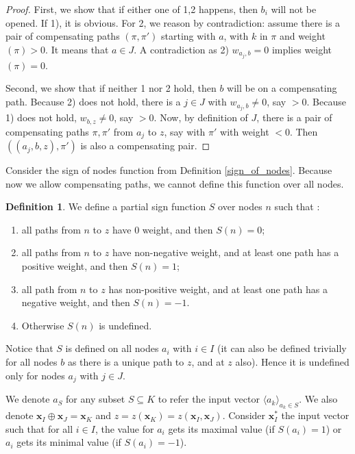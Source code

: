 \documentclass[]{article}
\theoremstyle{definition}
\newtheorem{definition}{Definition}
\begin{document}
\begin{proof}
	First, we show that if either one of 1,2 happens, then $b_i$ will not be opened. If 1), it is obvious. For 2, we reason by contradiction: assume there is a pair of compensating paths 	$(\pi,\pi')$ starting with $a$, with $k$ in $\pi$ and weight$(\pi) > 0$. It means that $a \in J$. A contradiction as 2) $w_{a_j,b}=0$ implies weight$(\pi)=0$.
	
	Second, we show that if neither 1 nor 2 hold, then $b$ will be on a compensating path.
	Because 2) does not hold, there is a $j \in J$ with $w_{a_j,b} \neq 0$, say $>0$.
	Because 1) does not hold, $w_{b,z} \neq 0$, say $>0$.
	Now, by definition of $J$, there is a pair of compensating paths $\pi,\pi'$ 
	from $a_j$ to $z$, say with $\pi'$ with weight $<0$.
	Then $((a_j,b,z), \pi')$ is also a compensating pair.
\end{proof}

Consider the sign of nodes function from Definition \ref{sign_of_nodes}. Because now we allow compensating paths, we cannot define this function over all nodes.


\begin{definition}\label{sign_of_nodes_in_I}
	We define a partial sign function $S$ over nodes $n$ such that : 	
	\begin{enumerate} 
		 \item all paths from $n$ to $z$ have 0 weight, and then $S(n)=0$; 
		 \item all paths from $n$ to $z$ have non-negative weight, and at least one path has a positive weight, and then $S(n)=1$; 
		 \item all path from $n$ to $z$ has non-positive weight, and at least one path has a negative weight, and then $S(n)=-1$.
		 \item Otherwise $S(n)$ is undefined.
	\end{enumerate}
\end{definition}	
	
Notice that $S$ is defined on all nodes $a_i$ with $i \in I$ (it can also be defined trivially for all nodes $b$ as there is a unique path to $z$, and at $z$ also). Hence it is undefined only for nodes $a_j$ with $j \in J$.


We denote $a_S$ for any subset $S\subseteq K$ to refer the input vector $\langle a_k\rangle_{a_k\in S}$. We also denote $\boldsymbol{x}_I\oplus \boldsymbol{x}_J = \boldsymbol{x}_K$ and $z=z(\boldsymbol{x}_K)=z(\boldsymbol{x}_I,\boldsymbol{x}_J)$.
Consider $\boldsymbol{x}_I^*$ the input vector such that for all $i \in I$, the value for $a_i$ gets its maximal value (if $S(a_i)=1$) or $a_i$ gets its minimal value (if $S(a_i)=-1$).
\end{document}
